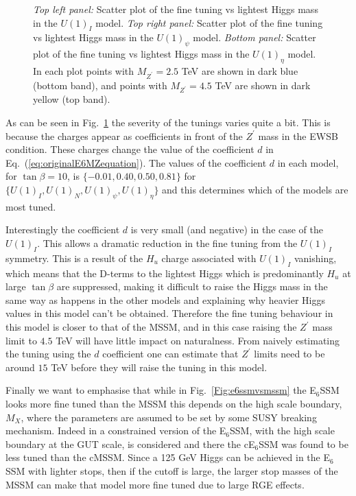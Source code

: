 \documentclass[preprint,amsmath,amssymb,aps,superscriptaddress,prd,showpacs,floatfix,nofootinbib]{revtex4-1}
\begin{document}
\begin{figure}
\begin{center}
\caption{\textit{Top left panel:} Scatter plot of the fine tuning vs lightest Higgs mass in the $U(1)_I$ model. \textit{Top right panel:} Scatter plot of the fine tuning vs lightest Higgs mass in the $U(1)_\psi$ model. \textit{Bottom panel:} Scatter plot of the fine tuning vs lightest Higgs mass in the $U(1)_\eta$ model. In each plot points with $M_{Z^\prime} = 2.5$ TeV are shown in dark blue
(bottom band), and points with $M_{Z^\prime} = 4.5$ TeV are shown in dark yellow (top band).}
\label{Fig:othere6modelsvsmssm}
\end{center}
\end{figure}

As can be seen in Fig.~\ref{Fig:othere6modelsvsmssm} the severity of the tunings varies quite
a bit.  This is because the charges appear as coefficients in front of
the $Z^\prime$ mass in the EWSB condition.  These charges change the
value of the coefficient $d$ in Eq.~(\ref{eq:originalE6MZequation}).
The values of the coefficient $d$ in each model, for $\tan\beta = 10$,
is $\{-0.01, 0.40, 0.50, 0.81 \}$ for $\{U(1)_I, U(1)_N, U(1)_\psi,
U(1)_\eta \}$ and this determines which of the models are most tuned.

Interestingly the coefficient $d$ is very small (and negative) in the
case of the $U(1)_I$.  This allows a dramatic reduction in the fine
tuning from the $U(1)_I$ symmetry.  This is a result of the $H_u$
charge associated with $U(1)_I$ vanishing, which means that the
D-terms to the lightest Higgs which is predominantly $H_u$ at large
$\tan \beta$ are suppressed, making it difficult to raise the Higgs
mass in the same way as happens in the other models and explaining why
heavier Higgs values in this model can't be obtained.  Therefore the
fine tuning behaviour in this model is closer to that of the MSSM, and
in this case raising the $Z^\prime$ mass limit to $4.5$ TeV will have
little impact on naturalness. From naively estimating the tuning
using the $d$ coefficient one can estimate that $Z^\prime$ limits
need to be around $15$ TeV before they will raise the tuning in this
model.

Finally we want to emphasise that while in Fig.~\ref{Fig:e6ssmvsmssm}
the E$_6$SSM looks more fine tuned than the MSSM this depends on the
high scale boundary, $M_X$, where the parameters are assumed to be set
by some SUSY breaking mechanism.  Indeed in \cite{Athron:2013ipa} a
constrained version of the E$_6$SSM, with the high scale boundary at
the GUT scale, is considered and there the cE$_6$SSM was found to be
less tuned than the cMSSM. Since a 125 GeV Higgs can be achieved in
the E$_6$SSM with lighter stops, then if the cutoff is large, the
larger stop masses of the MSSM can make that model more fine tuned due
to large RGE effects.
\end{document}
